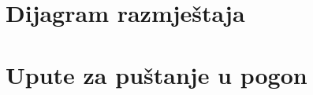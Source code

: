 %			 
			
			\eject 
		
		
		\section{Dijagram razmještaja}
			
			
			
			\eject 
		
		\section{Upute za puštanje u pogon}
		
		
			
